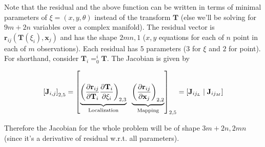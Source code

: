 Note that the residual and the above function can be written in terms of minimal parameters of $\xi = (x, y, \theta)$ instead of the transform $\mathbf{T}$ (else we'll be solving for $9m+2n$ variables over a complex manifold). The residual vector is $\mathbf{r}_{ij}(\mathbf{T}(\xi_i), \mathbf{x}_j)$ and has the shape $2mn, 1$ ($x, y$ equations for each of $n$ point in each of $m$ observations). Each residual has $5$ parameters ($3$ for $\xi$ and $2$ for point). For shorthand, consider $\mathbf{T}_i = ^i_0\mathbf{T}$. The Jacobian is given by

\begin{equation}
    \left [ \mathbf{J}_{i, j} \right ]_{2,5} =
    \left [ \underbrace{\left ( \frac{\partial \mathbf{r}_{ij}}{\partial \mathbf{T}_i} \frac{\partial \mathbf{T}_i}{\partial \xi_i} \right )_{2, 3}}_{\textup{Localization}} 
    \;\;
    \underbrace{\left ( \frac{\partial \mathbf{r}_{ij}}{\partial \mathbf{x}_j} \right )_{2, 2}}_{\textup{Mapping}} \right ]_{2, 5} = \left [ \mathbf{J}_{ij_L} \mid \mathbf{J}_{ij_M} \right ]
\end{equation}

Therefore the Jacobian for the whole problem will be of shape $3m + 2n, 2mn$ (since it's a derivative of residual w.r.t. all parameters).

